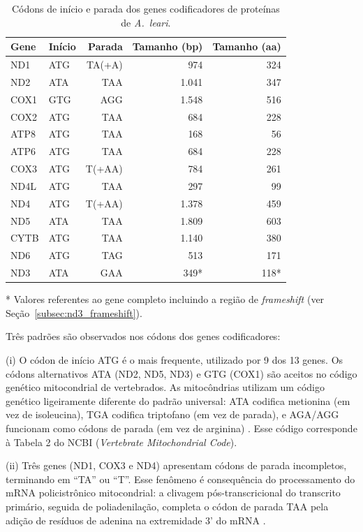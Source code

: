 \begin{table}[H]
\centering
\caption{Códons de início e parada dos genes codificadores de proteínas de \textit{A.~leari}.}
\label{tab:codons}
\begin{tabular}{@{}llrrr@{}}
\toprule
\textbf{Gene} & \textbf{Início} & \textbf{Parada} & \textbf{Tamanho (bp)} & \textbf{Tamanho (aa)} \\
\midrule
ND1  & ATG & TA(+A)  & 974   & 324 \\
ND2  & ATA & TAA     & 1.041 & 347 \\
COX1 & GTG & AGG     & 1.548 & 516 \\
COX2 & ATG & TAA     & 684   & 228 \\
ATP8 & ATG & TAA     & 168   & 56  \\
ATP6 & ATG & TAA     & 684   & 228 \\
COX3 & ATG & T(+AA)  & 784   & 261 \\
ND4L & ATG & TAA     & 297   & 99  \\
ND4  & ATG & T(+AA)  & 1.378 & 459 \\
ND5  & ATA & TAA     & 1.809 & 603 \\
CYTB & ATG & TAA     & 1.140 & 380 \\
ND6  & ATG & TAG     & 513   & 171 \\
ND3  & ATA & GAA     & 349*  & 118* \\
\bottomrule
\end{tabular}
\begin{flushleft}
\small{* Valores referentes ao gene completo incluindo a região de \textit{frameshift} (ver Seção~\ref{subsec:nd3_frameshift}).}
\end{flushleft}
\end{table}

Três padrões são observados nos códons dos genes codificadores:

(i) O códon de início ATG é o mais frequente, utilizado por 9 dos 13 genes. Os códons alternativos ATA (ND2, ND5, ND3) e GTG (COX1) são aceitos no código genético mitocondrial de vertebrados. As mitocôndrias utilizam um código genético ligeiramente diferente do padrão universal: ATA codifica metionina (em vez de isoleucina), TGA codifica triptofano (em vez de parada), e AGA/AGG funcionam como códons de parada (em vez de arginina) \cite{anderson1981,boore1999}. Esse código corresponde à Tabela 2 do NCBI (\textit{Vertebrate Mitochondrial Code}).

(ii) Três genes (ND1, COX3 e ND4) apresentam códons de parada incompletos, terminando em ``TA'' ou ``T''. Esse fenômeno é consequência do processamento do mRNA policistrônico mitocondrial: a clivagem pós-transcricional do transcrito primário, seguida de poliadenilação, completa o códon de parada TAA pela adição de resíduos de adenina na extremidade 3' do mRNA \cite{anderson1981}.

